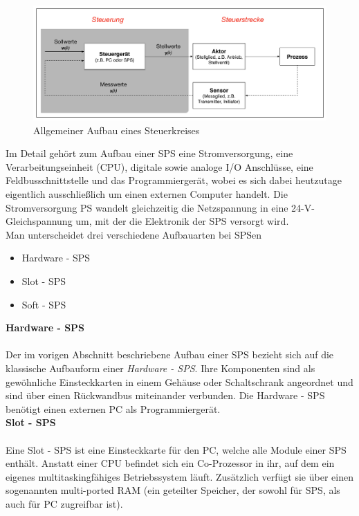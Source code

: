  	\begin{figure}[h!]
  		\centering
      	\includegraphics[width=1\textwidth]{graphics/stateoftheart/Aufbau_Steuerkreis_Selfmade.png}
  		\caption{Allgemeiner Aufbau eines Steuerkreises}
			\label{fig:Aufbau_Steuerkreis_Selfmade}
	\end{figure}	
 
 
 Im Detail gehört zum Aufbau einer \ac{SPS} eine Stromversorgung, eine Verarbeitungseinheit (\ac{CPU}), digitale sowie analoge I/O Anschlüsse, eine Feldbusschnittstelle und das Programmiergerät, wobei es sich dabei heutzutage eigentlich ausschließlich um einen externen Computer handelt. Die Stromversorgung \ac{PS} wandelt gleichzeitig die Netzspannung in eine 24-V-Gleichspannung um, mit der die Elektronik der \ac{SPS} versorgt wird.\\
	
	Man unterscheidet drei verschiedene Aufbauarten bei \ac{SPS}en
	
	\begin{itemize}
  		\item Hardware - \ac{SPS}
  		\item Slot - \ac{SPS}
  		\item Soft - \ac{SPS}
	\end{itemize}

	\textbf{Hardware - \ac{SPS}}\\\\
	Der im vorigen Abschnitt beschriebene Aufbau einer \ac{SPS} bezieht sich auf die klassische Aufbauform einer \textit{Hardware - \ac{SPS}}. Ihre Komponenten sind als gewöhnliche Einsteckkarten in einem Gehäuse oder Schaltschrank angeordnet und sind über einen Rückwandbus miteinander verbunden. Die Hardware - \ac{SPS} benötigt einen externen PC als Programmiergerät.\\
	
	\textbf{Slot - \ac{SPS}}\\\\
	Eine Slot - \ac{SPS} ist eine Einsteckkarte für den PC, welche alle Module einer \ac{SPS} enthält. Anstatt einer \ac{CPU} befindet sich ein Co-Prozessor in ihr, auf dem ein eigenes multitaskingfähiges Betriebssystem läuft. Zusätzlich verfügt sie über einen sogenannten multi-ported RAM (ein geteilter Speicher, der sowohl für \ac{SPS}, als auch für PC zugreifbar ist).\\
	
